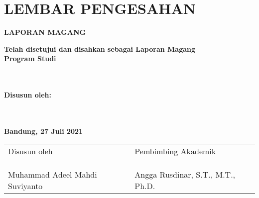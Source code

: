\chapter*{LEMBAR PENGESAHAN} %


\begin{center} %
	\large
	\textbf{LAPORAN MAGANG}
	\bigskip
	
	\Large
	\textbf{\JUDUL}
	\bigskip
	
	\bigskip
	\bigskip
	\bigskip
	
	\normalsize
	\textbf{Telah disetujui dan disahkan sebagai Laporan Magang}\\
	\textbf{Program Studi \prodi}\\
	\textbf{\fakultas}\\
	\textbf{\universitas}\\
	\bigskip
	\bigskip
	
	\textbf{Disusun oleh:}\\
	\textbf{\PENULIS}\\
	\textbf{\nim}\\
	\bigskip
	\bigskip
	
	\textbf{Bandung, 27 Juli 2021}\\
	\begin{tabular}{|p{6cm}|p{6cm}|}
		\hline
		Disusun oleh & Pembimbing Akademik \\
		& \\
		& \\
		& \\
		Muhammad Adeel Mahdi Suviyanto & Angga Rusdinar, S.T., M.T., Ph.D. \\
		\hline
	\end{tabular}
\end{center}

